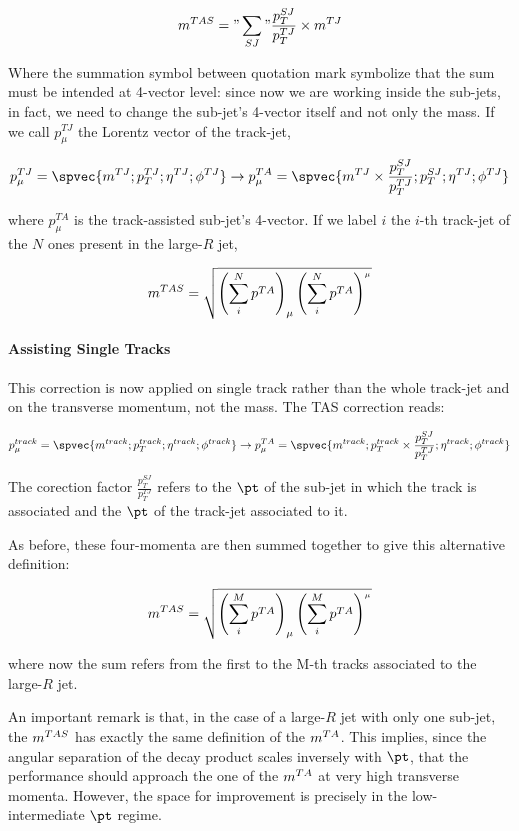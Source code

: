 $$m^{TAS}="\sum_{SJ}"\frac{p_T^{SJ}}{p_T^{TJ}}\times m^{TJ}$$

Where the summation symbol between quotation mark symbolize that the sum must be intended at 4-vector level: since now we are working inside the sub-jets, in fact, we need to change the sub-jet's 4-vector itself and not only the mass. If we call $p_\mu^{TJ}$ the Lorentz vector of the track-jet, 

$$p_\mu^{TJ} = \spvec{m^{TJ};p_T^{TJ};\eta^{TJ};\phi^{TJ}} \to p_\mu^{TA}=\spvec{m^{TJ}\times\frac{p_T^{SJ}}{p_T^{TJ}} ;p_T^{SJ};\eta^{TJ};\phi^{TJ}} $$
 
where $p_\mu^{TA}$ is the track-assisted sub-jet's 4-vector. If we label $i$ the $i$-th track-jet of the $N$ ones present in the large-$R$ jet,

$$ m^{TAS}=\sqrt{\left(\sum_i^N p^{TA} \right)_\mu \left(\sum_i^N p^{TA} \right)^{_\mu}} $$

\paragraph{Assisting Single Tracks}
\label{sec:tas}

This correction is now applied on single track rather than the whole track-jet and on the transverse momentum, not the mass.
The TAS correction reads:

$$p_\mu^{track} = \spvec{m^{track};p_T^{track};\eta^{track};\phi^{track}} \to p_\mu^{TA}=\spvec{m^{track} ;p_T^{track} \times\frac{p_T^{SJ}}{p_T^{TJ}};\eta^{track};\phi^{track}}$$

The corection factor $\frac{p_T^{SJ}}{p_T^{TJ}}$ refers to the $\pt$ of the sub-jet in which the track is associated and the $\pt$ of the track-jet associated to it.


As before, these four-momenta are then summed together to give this alternative definition:

$$ m^{TAS}=\sqrt{\left(\sum_i^M p^{TA} \right)_\mu \left(\sum_i^M p^{TA} \right)^{_\mu}} $$

where now the sum refers from the first to the M-th tracks associated to the large-$R$ jet.


An important remark is that, in the case of a large-$R$ jet with only one sub-jet, the $m^{TAS}$ has exactly the same definition of the $m^{TA}$. This implies, since the angular separation of the decay product scales inversely with $\pt$, that the performance should approach the one of the $m^{TA}$ at very high transverse momenta. However, the space for improvement is precisely in the low-intermediate $\pt$ regime.


